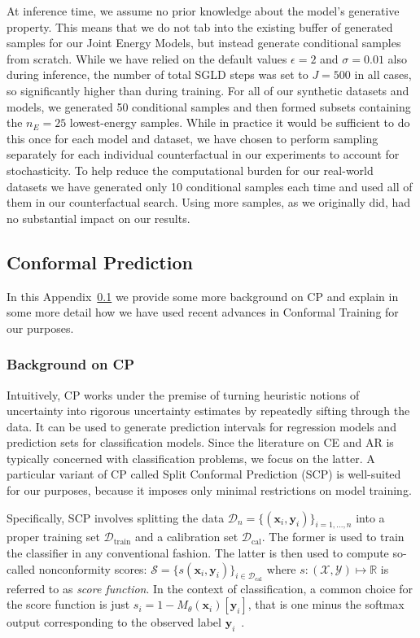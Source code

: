 \documentclass{article}
\begin{document}
At inference time, we assume no prior knowledge about the model's generative property. This means that we do not tab into the existing buffer of generated samples for our Joint Energy Models, but instead generate conditional samples from scratch. While we have relied on the default values $\epsilon=2$ and $\sigma=0.01$ also during inference, the number of total SGLD steps was set to $J=500$ in all cases, so significantly higher than during training. For all of our synthetic datasets and models, we generated 50 conditional samples and then formed subsets containing the $n_{E}=25$ lowest-energy samples. While in practice it would be sufficient to do this once for each model and dataset, we have chosen to perform sampling separately for each individual counterfactual in our experiments to account for stochasticity. To help reduce the computational burden for our real-world datasets we have generated only 10 conditional samples each time and used all of them in our counterfactual search. Using more samples, as we originally did, had no substantial impact on our results.

\subsection{Conformal Prediction}\label{app:cp}

In this Appendix~\ref{app:cp} we provide some more background on CP and explain in some more detail how we have used recent advances in Conformal Training for our purposes.

\subsubsection{Background on CP}

Intuitively, CP works under the premise of turning heuristic notions of uncertainty into rigorous uncertainty estimates by repeatedly sifting through the data. It can be used to generate prediction intervals for regression models and prediction sets for classification models. Since the literature on CE and AR is typically concerned with classification problems, we focus on the latter. A particular variant of CP called Split Conformal Prediction (SCP) is well-suited for our purposes, because it imposes only minimal restrictions on model training. 

Specifically, SCP involves splitting the data $\mathcal{D}_n=\{(\mathbf{x}_i,\mathbf{y}_i)\}_{i=1,...,n}$ into a proper training set $\mathcal{D}_{\text{train}}$ and a calibration set $\mathcal{D}_{\text{cal}}$. The former is used to train the classifier in any conventional fashion. The latter is then used to compute so-called nonconformity scores: $\mathcal{S}=\{s(\mathbf{x}_i,\mathbf{y}_i)\}_{i \in \mathcal{D}_{\text{cal}}}$ where $s: (\mathcal{X},\mathcal{Y}) \mapsto \mathbb{R}$ is referred to as \textit{score function}. In the context of classification, a common choice for the score function is just $s_i=1-M_{\theta}(\mathbf{x}_i)[\mathbf{y}_i]$, that is one minus the softmax output corresponding to the observed label $\mathbf{y}_i$~\citep{angelopoulos2021gentle}. 
\end{document}
